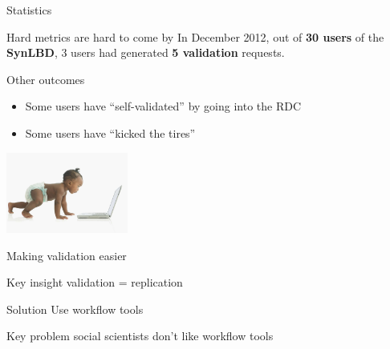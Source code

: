 \begin{frame}{Statistics}
\begin{block}{Hard metrics are hard to come by}
In December 2012,  out of {\bf 30 users} of the {\bf SynLBD}, 3 users had generated {\bf 5 
validation} requests.
\end{block}
\begin{block}{Other outcomes}
\begin{itemize}
\item Some users have ``self-validated'' by going into the RDC
\item Some users have ``kicked the tires'' 
\end{itemize}
\end{block}
\pause
{}\includegraphics[width=0.3\textwidth]{baby.jpg}

\end{frame}


%
%
%


\begin{frame}[<+->]{Making validation easier}
\begin{block}{Key insight}
\centering
validation = replication
\end{block}

\begin{block}{Solution}
\centering
Use workflow tools
\end{block}

\begin{block}{Key problem}
\centering
social scientists don't like workflow tools
\end{block}

\end{frame}

